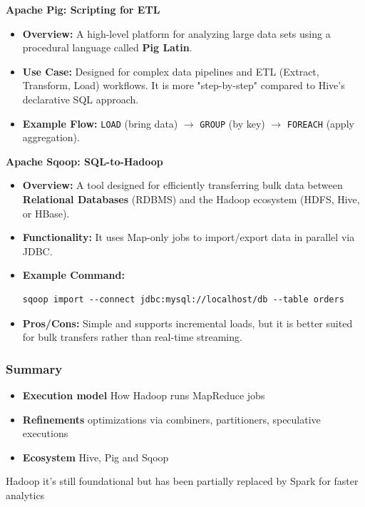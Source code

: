 \textbf{Apache Pig: Scripting for ETL}
\begin{itemize}
    \item \textbf{Overview:} A high-level platform for analyzing large data sets using a procedural language called \textbf{Pig Latin}.
    \item \textbf{Use Case:} Designed for complex data pipelines and ETL (Extract, Transform, Load) workflows. It is more "step-by-step" compared to Hive's declarative SQL approach.
    \item \textbf{Example Flow:} \texttt{LOAD} (bring data) $\rightarrow$ \texttt{GROUP} (by key) $\rightarrow$ \texttt{FOREACH} (apply aggregation).
\end{itemize}

\textbf{Apache Sqoop: SQL-to-Hadoop}
\begin{itemize}
    \item \textbf{Overview:} A tool designed for efficiently transferring bulk data between \textbf{Relational Databases} (RDBMS) and the Hadoop ecosystem (HDFS, Hive, or HBase).
    \item \textbf{Functionality:} It uses Map-only jobs to import/export data in parallel via JDBC.
    
    
    
    \item \textbf{Example Command:}
\begin{verbatim}
sqoop import --connect jdbc:mysql://localhost/db --table orders
\end{verbatim}
    \item \textbf{Pros/Cons:} Simple and supports incremental loads, but it is better suited for bulk transfers rather than real-time streaming.
\end{itemize}


\subsubsection{Summary}

\begin{itemize}
    \item \textbf{Execution model} \ra How Hadoop runs MapReduce jobs
    \item \textbf{Refinements} \ra optimizations via combiners, partitioners, speculative executions
    \item \textbf{Ecosystem} \ra Hive, Pig and Sqoop
\end{itemize}

Hadoop it's still foundational but has been partially replaced by Spark for faster analytics

